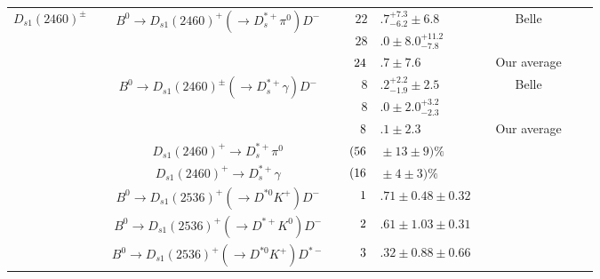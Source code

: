 \begin{adjustbox}{width=\textwidth,center}
{\begin{tabular}{cp{5pt}cp{5pt}r@{}lp{5pt}cp{5pt}c}
	\multirow{9}{*}[-5pt]{$D_{s1}(2460)^{\pm}$}	&&	\multirow{3}{*}{$B^{0}\to D_{s1}(2460)^{+}(\to D^{*+}_{s}\pi^{0})D^{-}$}	&&$	22$&$.7^{+7.3}_{-6.2}\pm6.8	$&&	Belle	&&	\cite{Krokovny:2003zq}        \\
		&&		&&$	28$&$.0\pm 8.0{}^{+11.2}_{-7.8}	$&&	\babar{}	&&	\cite{Aubert:2004pw}          \\  \cmidrule{4-9}
		&&		&\cellcolor{Gray}&$	\cellcolor{Gray}24$&\cellcolor{Gray}$.7 \pm 7.6	$&\cellcolor{Gray}&	\cellcolor{Gray}  Our average	&\cellcolor{Gray}&	\\ \cmidrule{3-9}
		&&	\multirow{3}{*}{$B^{0}\to D_{s1}(2460)^{\pm}(\to D^{*+}_{s}\gamma)D^{-}$}	&&$	8$&$.2^{+2.2}_{-1.9}\pm2.5	$&&	Belle	&&	\cite{Krokovny:2003zq}        \\
		&&		&&$	8$&$.0\pm 2.0{}^{+3.2}_{-2.3}	$&&	\babar{}	&&	\cite{Aubert:2004pw}          \\  \cmidrule{4-9}
		&&		&\cellcolor{Gray}&$	\cellcolor{Gray}8$&\cellcolor{Gray}$.1 \pm 2.3	$&\cellcolor{Gray}&	\cellcolor{Gray}  Our average	&\cellcolor{Gray}&	\\ \cmidrule{3-9}
		&&	$D_{s1}(2460)^{+}\to D^{*+}_{s}\pi^{0}$	&\cellcolor{LightGray} &$	\cellcolor{LightGray} (56$&\cellcolor{LightGray}${}\pm13\pm9)\%	$&\cellcolor{LightGray}&	\cellcolor{LightGray} \babar{}	&\cellcolor{LightGray}&	\cite{Aubert:2006nm}          \\ \cmidrule{3-9}
		&&	$D_{s1}(2460)^{+}\to D^{*+}_{s}\gamma$	&\cellcolor{LightGray} &$	\cellcolor{LightGray} (16$&\cellcolor{LightGray}${}\pm4\pm3)\%	$&\cellcolor{LightGray}&	\cellcolor{LightGray} \babar{}	&\cellcolor{LightGray}&	\cite{Aubert:2006nm}          \\ \midrule
		&&	\multirow{1}{*}{$B^{0}\to D_{s1}(2536)^{+}(\to D^{*0}K^{+})D^{-}$}	&\cellcolor{LightGray} &$	\cellcolor{LightGray} 1$&\cellcolor{LightGray}$.71\pm0.48\pm0.32	$&\cellcolor{LightGray}&	\cellcolor{LightGray} \babar{}	&\cellcolor{LightGray}&	\cite{Aubert:2007rva}         \\ \cmidrule{3-9}
		&&	\multirow{1}{*}{$B^{0}\to D_{s1}(2536)^{+}(\to D^{*+}K^{0})D^{-}$}	&\cellcolor{LightGray} &$	\cellcolor{LightGray} 2$&\cellcolor{LightGray}$.61\pm1.03\pm0.31	$&\cellcolor{LightGray}&	\cellcolor{LightGray} \babar{}	&\cellcolor{LightGray}&	\cite{Aubert:2007rva}         \\ \cmidrule{3-9}
		&&	\multirow{1}{*}{$B^{0}\to D_{s1}(2536)^{+}(\to D^{*0}K^{+})D^{*-}$}	&\cellcolor{LightGray} &$	\cellcolor{LightGray} 3$&\cellcolor{LightGray}$.32\pm0.88\pm0.66	$&\cellcolor{LightGray}&	\cellcolor{LightGray} \babar{}	&\cellcolor{LightGray}&	\cite{Aubert:2007rva}         \\ \cmidrule{3-9}

\end{tabular}}
\end{adjustbox}
